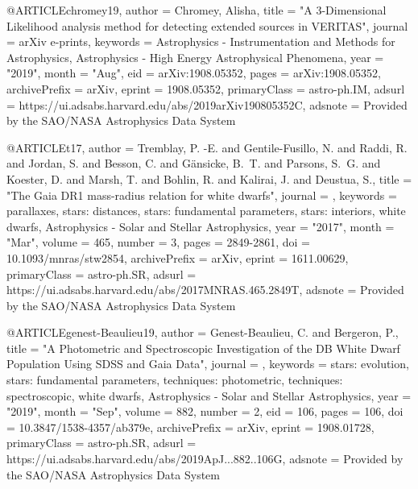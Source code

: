 \documentclass[a4paper,fleqn,usenatbib]{mnras}
\begin{document}
{{{{{{{{{{{@ARTICLE{chromey19,
       author = {{Chromey}, Alisha},
        title = "{A 3-Dimensional Likelihood analysis method for detecting extended sources in VERITAS}",
      journal = {arXiv e-prints},
     keywords = {Astrophysics - Instrumentation and Methods for Astrophysics, Astrophysics - High Energy Astrophysical Phenomena},
         year = "2019",
        month = "Aug",
          eid = {arXiv:1908.05352},
        pages = {arXiv:1908.05352},
archivePrefix = {arXiv},
       eprint = {1908.05352},
 primaryClass = {astro-ph.IM},
       adsurl = {https://ui.adsabs.harvard.edu/abs/2019arXiv190805352C},
      adsnote = {Provided by the SAO/NASA Astrophysics Data System}
}

@ARTICLE{t17,
       author = {{Tremblay}, P. -E. and {Gentile-Fusillo}, N. and {Raddi}, R. and
         {Jordan}, S. and {Besson}, C. and {G{\"a}nsicke}, B.~T. and
         {Parsons}, S.~G. and {Koester}, D. and {Marsh}, T. and {Bohlin}, R. and
         {Kalirai}, J. and {Deustua}, S.},
        title = "{The Gaia DR1 mass-radius relation for white dwarfs}",
      journal = {\mnras},
     keywords = {parallaxes, stars: distances, stars: fundamental parameters, stars: interiors, white dwarfs, Astrophysics - Solar and Stellar Astrophysics},
         year = "2017",
        month = "Mar",
       volume = {465},
       number = {3},
        pages = {2849-2861},
          doi = {10.1093/mnras/stw2854},
archivePrefix = {arXiv},
       eprint = {1611.00629},
 primaryClass = {astro-ph.SR},
       adsurl = {https://ui.adsabs.harvard.edu/abs/2017MNRAS.465.2849T},
      adsnote = {Provided by the SAO/NASA Astrophysics Data System}
}


@ARTICLE{genest-Beaulieu19,
       author = {{Genest-Beaulieu}, C. and {Bergeron}, P.},
        title = "{A Photometric and Spectroscopic Investigation of the DB White Dwarf Population Using SDSS and Gaia Data}",
      journal = {\apj},
     keywords = {stars: evolution, stars: fundamental parameters, techniques: photometric, techniques: spectroscopic, white dwarfs, Astrophysics - Solar and Stellar Astrophysics},
         year = "2019",
        month = "Sep",
       volume = {882},
       number = {2},
          eid = {106},
        pages = {106},
          doi = {10.3847/1538-4357/ab379e},
archivePrefix = {arXiv},
       eprint = {1908.01728},
 primaryClass = {astro-ph.SR},
       adsurl = {https://ui.adsabs.harvard.edu/abs/2019ApJ...882..106G},
      adsnote = {Provided by the SAO/NASA Astrophysics Data System}
}



}}}}}}}}}}}
\end{document}
